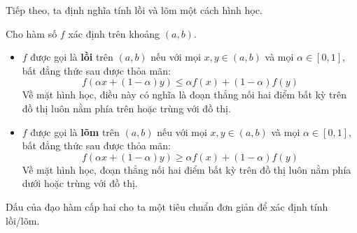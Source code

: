 Tiếp theo, ta định nghĩa tính lồi và lõm một cách hình học.

\begin{definition}
\label{def:convexity}
Cho hàm số $f$ xác định trên khoảng $(a,b)$.
\begin{itemize}
    \item $f$ được gọi là \textbf{lồi} trên $(a,b)$ nếu với mọi $x, y \in (a,b)$ và mọi $\alpha \in [0, 1]$, bất đẳng thức sau được thỏa mãn:
    $$f(\alpha x + (1-\alpha)y) \le \alpha f(x) + (1-\alpha)f(y)$$
    Về mặt hình học, điều này có nghĩa là đoạn thẳng nối hai điểm bất kỳ trên đồ thị luôn nằm phía trên hoặc trùng với đồ thị.
    \item $f$ được gọi là \textbf{lõm} trên $(a,b)$ nếu với mọi $x, y \in (a,b)$ và mọi $\alpha \in [0, 1]$, bất đẳng thức sau được thỏa mãn:
    $$f(\alpha x + (1-\alpha)y) \ge \alpha f(x) + (1-\alpha)f(y)$$
    Về mặt hình học, đoạn thẳng nối hai điểm bất kỳ trên đồ thị luôn nằm phía dưới hoặc trùng với đồ thị.
\end{itemize}
\end{definition}

%     

% 

Dấu của đạo hàm cấp hai cho ta một tiêu chuẩn đơn giản để xác định tính lồi/lõm.

